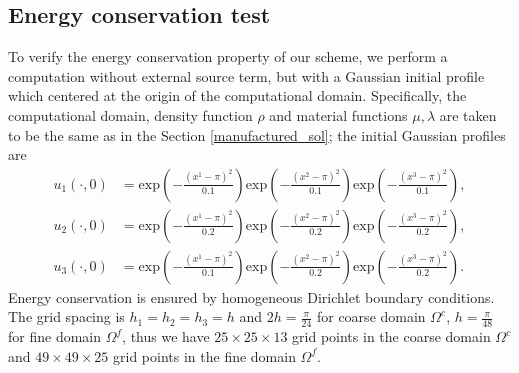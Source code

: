 \subsection{Energy conservation test}\label{conserved_energy}
To verify the energy conservation property of our scheme, we perform a computation without external source term, but with a Gaussian initial profile which centered at the origin of the computational domain.  Specifically, the computational domain, density function $\rho$ and material functions $\mu, \lambda$ are taken to be the same as in the Section \ref{manufactured_sol}; the initial Gaussian profiles are
\begin{align*}
	u_1(\cdot,0) &= \mbox{exp}\left(-\frac{(x^1-\pi)^2}{0.1}\right)\mbox{exp}\left(-\frac{(x^2-\pi)^2}{0.1}\right)\mbox{exp}\left(-\frac{(x^3-\pi)^2}{0.1}\right),\\
	u_2(\cdot,0) &= \mbox{exp}\left(-\frac{(x^1-\pi)^2}{0.2}\right)\mbox{exp}\left(-\frac{(x^2-\pi)^2}{0.2}\right)\mbox{exp}\left(-\frac{(x^3-\pi)^2}{0.2}\right),\\
	u_3(\cdot,0) &= \mbox{exp}\left(-\frac{(x^1-\pi)^2}{0.1}\right)\mbox{exp}\left(-\frac{(x^2-\pi)^2}{0.2}\right)\mbox{exp}\left(-\frac{(x^3-\pi)^2}{0.2}\right).
\end{align*}
Energy conservation is ensured by homogeneous Dirichlet boundary conditions. The grid spacing is $h_1 = h_2 = h_3 = h$ and $2h = \frac{\pi}{24}$ for coarse domain $\Omega^c$, $h = \frac{\pi}{48}$ for fine domain $\Omega^f$, thus we have $25\times25\times13$ grid points in the coarse domain $\Omega^c$ and $49\times49\times25$ grid points in the fine domain $\Omega^f$. 

